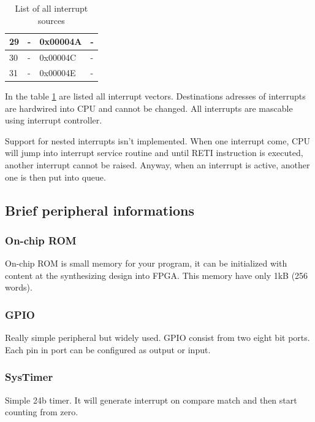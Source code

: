 \begin{table}[]
\begin{tabular}{|l|l|l|l|}
        29                  & -                   & 0x00004A        & -                              \\ \hline
        30                  & -                   & 0x00004C        & -                              \\ \hline
        31                  & -                   & 0x00004E        & -                              \\ \hline
    \end{tabular}
    \caption{List of all interrupt sources}
    \label{tab:intsources}
\end{table}

In the table \ref{tab:intsources} are listed all interrupt vectors. Destinations
adresses of interrupts are hardwired into CPU and cannot be changed. All
interrupts are mascable using interrupt controller.

Support for nested interrupts isn't implemented. When one interrupt come, CPU
will jump into interrupt service routine and until RETI instruction is executed,
another interrupt cannot be raised. Anyway, when an interrupt is active, another
one is then put into queue.

\subsection{Brief peripheral informations}

\subsubsection{On-chip ROM}

On-chip ROM is small memory for your program, it can be initialized with content
 at the synthesizing design into FPGA. This memory have only 1kB (256 words).

\subsubsection{GPIO}

Really simple peripheral but widely used. GPIO consist from two eight bit ports.
 Each pin in port can be configured as output or input.

\subsubsection{SysTimer}

Simple 24b timer. It will generate interrupt on compare match and then start
counting from zero.

